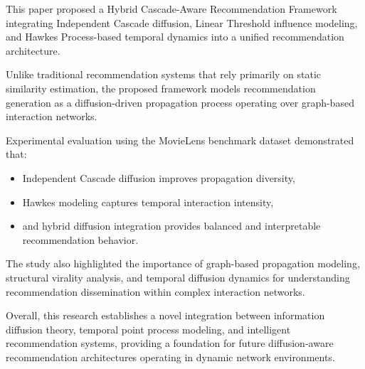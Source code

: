 \documentclass{article}
\begin{document}
This paper proposed a Hybrid Cascade-Aware Recommendation Framework integrating Independent Cascade diffusion, Linear Threshold influence modeling, and Hawkes Process-based temporal dynamics into a unified recommendation architecture.

Unlike traditional recommendation systems that rely primarily on static similarity estimation, the proposed framework models recommendation generation as a diffusion-driven propagation process operating over graph-based interaction networks.

Experimental evaluation using the MovieLens benchmark dataset demonstrated that:
\begin{itemize}
\item Independent Cascade diffusion improves propagation diversity,
\item Hawkes modeling captures temporal interaction intensity,
\item and hybrid diffusion integration provides balanced and interpretable recommendation behavior.
\end{itemize}

The study also highlighted the importance of graph-based propagation modeling, structural virality analysis, and temporal diffusion dynamics for understanding recommendation dissemination within complex interaction networks.

Overall, this research establishes a novel integration between information diffusion theory, temporal point process modeling, and intelligent recommendation systems, providing a foundation for future diffusion-aware recommendation architectures operating in dynamic network environments.


\end{document}

